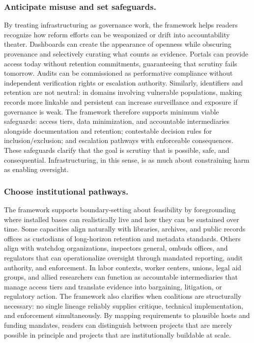 \documentclass[acmsmall,screen]{acmart}
\begin{document}
\subsubsection*{Anticipate misuse and set safeguards.}
By treating infrastructuring as governance work, the framework helps readers recognize how reform efforts can be weaponized or drift into accountability theater. Dashboards can create the appearance of openness while obscuring provenance and selectively curating what counts as evidence. Portals can provide access today without retention commitments, guaranteeing that scrutiny fails tomorrow. Audits can be commissioned as performative compliance without independent verification rights or escalation authority. Similarly, identifiers and retention are not neutral: in domains involving vulnerable populations, making records more linkable and persistent can increase surveillance and exposure if governance is weak. The framework therefore supports minimum viable safeguards: access tiers, data minimization, and accountable intermediaries alongside documentation and retention; contestable decision rules for inclusion/exclusion; and escalation pathways with enforceable consequences. These safeguards clarify that the goal is scrutiny that is possible, safe, and consequential. Infrastructuring, in this sense, is as much about constraining harm as enabling oversight.

\subsubsection*{Choose institutional pathways.}
The framework supports boundary-setting about feasibility by foregrounding where installed bases can realistically live and how they can be sustained over time. Some capacities align naturally with libraries, archives, and public records offices as custodians of long-horizon retention and metadata standards. Others align with watchdog organizations, inspectors general, ombuds offices, and regulators that can operationalize oversight through mandated reporting, audit authority, and enforcement. In labor contexts, worker centers, unions, legal aid groups, and allied researchers can function as accountable intermediaries that manage access tiers and translate evidence into bargaining, litigation, or regulatory action. The framework also clarifies when coalitions are structurally necessary: no single lineage reliably supplies critique, technical implementation, and enforcement simultaneously. By mapping requirements to plausible hosts and funding mandates, readers can distinguish between projects that are merely possible in principle and projects that are institutionally buildable at scale.
\end{document}
